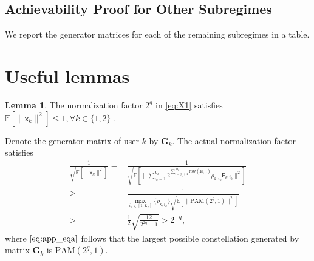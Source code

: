 \documentclass[12pt, draftclsnofoot, onecolumn]{IEEEtran}
\newcommand{\msf}[1]{\mathsf{#1}}
\newcommand{\E}{\mathbb{E}}
\theoremstyle{definition}
\newtheorem{lemma}{Lemma}
\begin{document}
\subsection{Achievability Proof for Other Subregimes}\label{app:corner}
We report the generator matrices for each of the remaining subregimes in a table.



















\section{Useful lemmas}\label{appendix:lemma}
\begin{lemma}\label{lem:normalization}
The normalization factor $2^q$ in \eqref{eq:X1} satisfies $\E[\|\msf{x}_k\|^2] \leq 1,\forall k\in\{1,2\}$ .
\end{lemma}
\begin{IEEEproof}
Denote the generator matrix of user $k$ by $\boldsymbol{G}_k$. The actual normalization factor satisfies
\begin{subequations}
\begin{align}
 \frac{1}{\sqrt{\E[\|\msf{x}_k\|^2]}}=& \frac{1}{\sqrt{\E[\|\sum_{i_k=1}^{L_k}2^{\sum_{i=j_k+1}^{M_k}\text{row}(\boldsymbol{E}_{k,i})}\rho_{k,i_k}\msf{F}_{k,i_k}\|^2]}} \\
\geq& \frac{1}{\max\limits_{i_k \in [1:L_k]}\{\rho_{k,i_k} \}\sqrt{\E[\|\text{PAM}(2^q,1)\|^2]}} \label{eq:app_eqa} \\
>& \frac{1}{2}\sqrt{\frac{12}{2^{2q}-1}} > 2^{-q},
\end{align}
\end{subequations}
where $\eqref{eq:app_eqa}$ follows that the largest possible constellation generated by matrix $\boldsymbol{G}_k$ is $\text{PAM}(2^q,1)$.
\end{IEEEproof}
\end{document}

